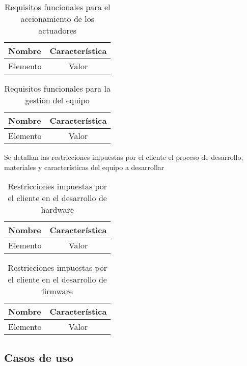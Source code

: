 \begin{table}[ht]
	\centering
	\caption{Requisitos funcionales para el accionamiento de los actuadores}
	\begin{tabular}{l c}    
		\toprule
		\textbf{Nombre} 	& \textbf{Característica}	\\
		\midrule
		Elemento 			& Valor	\\
		\bottomrule
		\hline
	\end{tabular}
	\label{tab:RequisitosActuadores}
\end{table}

\begin{table}[ht]
	\centering
	\caption{Requisitos funcionales para la gestión del equipo}
	\begin{tabular}{l c}    
		\toprule
		\textbf{Nombre} 	& \textbf{Característica}	\\
		\midrule
		Elemento 			& Valor	\\
		\bottomrule
		\hline
	\end{tabular}
	\label{tab:RequisitosGestion}
\end{table}

Se detallan las restricciones impuestas por el cliente el proceso de desarrollo, materiales y características del equipo a desarrollar

\begin{table}[ht]
	\centering
	\caption{Restricciones impuestas por el cliente en el desarrollo de hardware}
	\begin{tabular}{l c}    
		\toprule
		\textbf{Nombre} 	& \textbf{Característica}	\\
		\midrule
		Elemento 			& Valor	\\
		\bottomrule
		\hline
	\end{tabular}
	\label{tab:RestriccionesHardware}
\end{table}

\begin{table}[ht]
	\centering
	\caption{Restricciones impuestas por el cliente en el desarrollo de firmware}
	\begin{tabular}{l c}    
		\toprule
		\textbf{Nombre} 	& \textbf{Característica}	\\
		\midrule
		Elemento 			& Valor	\\
		\bottomrule
		\hline
	\end{tabular}
	\label{tab:RestriccionesFirmware}
\end{table}

\subsection{Casos de uso}

